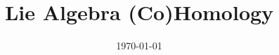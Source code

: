 \documentclass[12pt,a4paper]{article}
\title{Lie Algebra (Co)Homology}
\date{\today} %
\numberwithin{equation}{section}
\begin{document}
\maketitle %
\tableofcontents






\begin{appendices}

\end{appendices}



\end{document}
